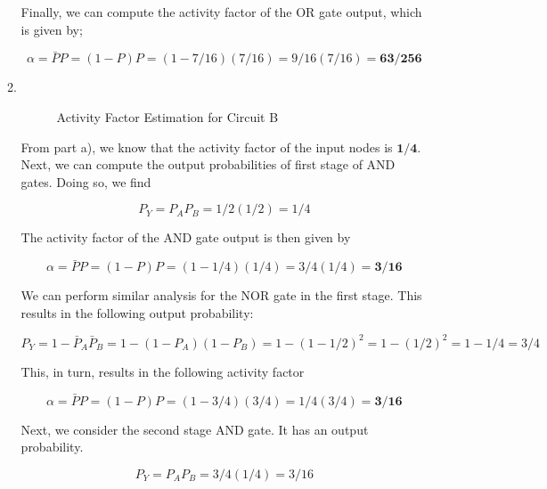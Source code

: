 \documentclass[fleqn]{article}
\begin{document}
\begin{enumerate}
\begin{enumerate}
			Finally, we can compute the activity factor of the OR gate output, which is given by;
			
			\begin{equation*}
				\alpha = \bar{P}P = (1 - P)P = (1 - 7/16)(7/16) = 9/16(7/16) = \mathbf{63/256}
			\end{equation*}
			
			\item ~
			
			\begin{figure}[H]				
				\centerline{}
				\caption{Activity Factor Estimation for Circuit B}
				\label{fig::activity_factor_b}
			\end{figure}
			
			From part a), we know that the activity factor of the input nodes is $\mathbf{1/4}$. Next, we can compute the output probabilities of first stage of AND gates. Doing so, we find
			
			\begin{equation*}
				P_Y = P_AP_B = 1/2(1/2) = 1/4
			\end{equation*}
			
			The activity factor of the AND gate output is then given by
			
			\begin{equation*}
				\alpha = \bar{P}P = (1 - P)P = (1 - 1/4)(1/4) = 3/4(1/4) = \mathbf{3/16}
			\end{equation*}
			
			We can perform similar analysis for the NOR gate in the first stage. This results in the following output probability:
			
			\begin{equation*}
				P_Y = 1 - \bar{P}_A\bar{P}_B = 1 - (1 - P_A)(1 - P_B) = 1 - (1 - 1/2)^2 = 1 - (1/2)^2 = 1 - 1/4 = 3/4
			\end{equation*}
			
			This, in turn, results in the following activity factor
			
			\begin{equation*}
				\alpha = \bar{P}P = (1 - P)P = (1 - 3/4)(3/4) = 1/4(3/4) = \mathbf{3/16}
			\end{equation*}
			
			Next, we consider the second stage AND gate. It has an output probability.
			
			\begin{equation*}
				P_Y = P_AP_B = 3/4(1/4) = 3/16
			\end{equation*}
			

\end{enumerate}
\end{enumerate}
\end{document}
